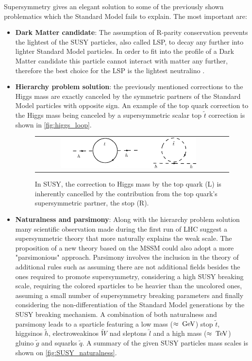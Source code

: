 \FloatBarrier

Supersymmetry gives an elegant solution to some of the  previously shown problematics which the Standard Model fails to explain. The most important are: 

\begin{itemize}
	\item \textbf{Dark Matter candidate}: The assumption of R-parity conservation prevents the lightest of the SUSY particles, also called LSP, to decay any further into lighter Standard Model particles. In order to fit into the profile of a Dark Matter candidate this particle cannot interact with matter any further, therefore the best choice for the LSP is the lightest neutralino \neutralinoone.  
	
	\item \textbf{Hierarchy problem solution}: the previously mentioned corrections to the Higgs mass are exactly canceled by the symmetric partners of the Standard Model particles with opposite sign. An example of the top quark correction to the Higgs mass being canceled by a supersymmetric scalar top $\widetilde{t}$ correction is shown in \autoref{fig:higgs_loop}.
	
	\begin{figure}[tbh!]
		\centering
		\begin{tabular}{cc}
			\includegraphics[width=0.75\textwidth]{theory/pics/higgs_loop.png}
		\end{tabular}
		\caption{In SUSY, the correction to Higgs mass by the top quark (L) is inherently cancelled by the contribution from the top quark's supersymmetric partner, the stop (R).}
		\label{fig:higgs_loop}
	\end{figure}

	\item \textbf{Naturalness and parsimony}: Along with the hierarchy problem solution many scientific observation made during the first run of LHC suggest a supersymmetric theory that more naturally explains the weak scale\cite{Craig:2013cxa}. The proposition of a new theory based on the MSSM could also adopt a more "parsimonious" approach. Parsimony involves the inclusion in the theory of additional rules such as assuming there are not additional fields besides the ones required to promote supersymmetry, considering a high SUSY breaking scale, requiring the colored sparticles to be heavier than the uncolored ones, assuming a small number of supersymmetry breaking parameters and finally considering the non-differentiation of the Standard Model generations by the SUSY breaking mechanism. A combination of both naturalness and parsimony leads to a sparticle featuring a low mass ($\approx\;\text{Ge}\kern-0.06667em\text{V}$) stop $\widetilde{t}$, higgsinos $\widetilde{h}$, electroweakinos $\widetilde{W}$ nad sleptons $\widetilde{l}$ and a high mass ($\approx\;\text{Te}\kern-0.06667em\text{V}$) gluino $\widetilde{g}$ and squarks $\widetilde{q}$. A summary of the given SUSY particles mass scales is shown on \autoref{fig:SUSY_naturalness}.


\end{itemize}
